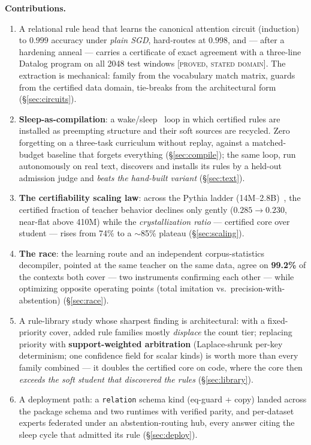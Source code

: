 \documentclass[sigconf,nonacm]{acmart}
\newcommand{\code}[1]{\texttt{#1}}
\newcommand{\tagp}[1]{\textsc{\small[#1]}}
\begin{document}
\textbf{Contributions.}
\begin{enumerate}
\item A relational rule head that learns the canonical attention circuit (induction) to
$0.999$ accuracy under \emph{plain SGD}, hard-routes at $0.998$, and --- after a hardening anneal
--- carries a certificate of exact agreement with a three-line Datalog program on all 2048 test
windows \tagp{proved, stated domain}. The extraction is mechanical: family from the vocabulary
match matrix, guards from the certified data domain, tie-breaks from the architectural form
(\S\ref{sec:circuits}).
\item \textbf{Sleep-as-compilation}: a wake/sleep~\cite{hintonwakesleep1995} loop in which
certified rules are installed as preempting structure and their soft sources are recycled.
Zero forgetting on a three-task curriculum without replay, against a matched-budget baseline that
forgets everything (\S\ref{sec:compile}); the same loop, run autonomously on real text, discovers
and installs its rules by a held-out admission judge and \emph{beats the hand-built variant}
(\S\ref{sec:text}).
\item \textbf{The certifiability scaling law}: across the Pythia ladder
(14M--2.8B)~\cite{biderman2023pythia}, the certified fraction of teacher behavior declines only
gently ($0.285\!\to\!0.230$, near-flat above 410M) while the \emph{crystallization ratio} ---
certified core over student --- rises from 74\% to a $\sim$85\% plateau (\S\ref{sec:scaling}).
\item \textbf{The race}: the learning route and an independent corpus-statistics decompiler,
pointed at the same teacher on the same data, agree on \textbf{99.2\%} of the contexts both
cover --- two instruments confirming each other --- while optimizing opposite operating points
(total imitation vs.\ precision-with-abstention) (\S\ref{sec:race}).
\item A rule-library study whose sharpest finding is architectural: with a fixed-priority cover,
added rule families mostly \emph{displace} the count tier; replacing priority with
\textbf{support-weighted arbitration} (Laplace-shrunk per-key determinism; one confidence field
for scalar kinds) is worth more than every family combined --- it doubles the certified core on
code, where the core then \emph{exceeds the soft student that discovered the rules}
(\S\ref{sec:library}).
\item A deployment path: a \code{relation} schema kind (eq-guard + copy) landed across the
package schema and two runtimes with verified parity, and per-dataset experts federated under an
abstention-routing hub, every answer citing the sleep cycle that admitted its rule
(\S\ref{sec:deploy}).
\end{enumerate}
\end{document}
